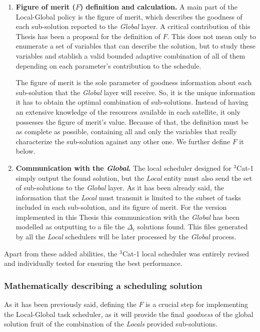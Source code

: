 \begin{enumerate}
\item \textbf{Figure of merit ($F$) definition and calculation. } A main part of the Local-Global policy is the figure of merit, which describes the goodness of each sub-solution reported to the \emph{Global} layer. A critical contribution of this Thesis has been a proposal for the definition of $F$. This does not mean only to enumerate a set of variables that can describe the solution, but to study these variables and stablish a valid bounded adaptive combination of all of them depending on each parameter's contribution to the schedule. 

The figure of merit is the sole parameter of goodness information about each sub-solution that the \emph{Global} layer will receive. So, it is the unique information it has to obtain the optimal combination of sub-solutions. Instead of having an extensive knowledge of the resources available in each satellite, it only possesses the figure of merit's value. Because of that, the definition must be as complete as possible, containing all and only the variables that really characterize the sub-solution against any other one. We further define $F$ it below.

\item \textbf{Communication with the \emph{Global}. } The local scheduler designed for $^3$Cat-1 simply output the found solution, but the \emph{Local} entity must also send the set of sub-solutions to the \emph{Global} layer. As it has been already said, the information that the \emph{Local} must transmit is limited to the subset of tasks included in each sub-solution, and its figure of merit. For the version implemented in this Thesis this communication with the \emph{Global} has been modelled as outputting to a file the $\Delta_i$ solutions found. This files generated by all the \emph{Local} schedulers will be later processed by the \emph{Global} process.

\end{enumerate}

Apart from these added abilities, the $^3$Cat-1 local scheduler was entirely revised and individually tested for ensuring the best performance.

\subsubsection{Mathematically describing a scheduling solution}
\label{sec_F_LG}

As it has been previously said, defining the $F$ is a crucial step for implementing the Local-Global task scheduler, as it will provide the final \emph{goodness} of the global solution fruit of the combination of the \emph{Locals} provided sub-solutions.

